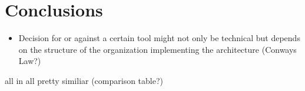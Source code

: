 \section{Conclusions}

\begin{itemize}
\item Decision for or against a certain tool might not only be technical but depends on the structure of the organization implementing the architecture (Conways Law?)
\end{itemize}

all in all pretty similiar (comparison table?)

